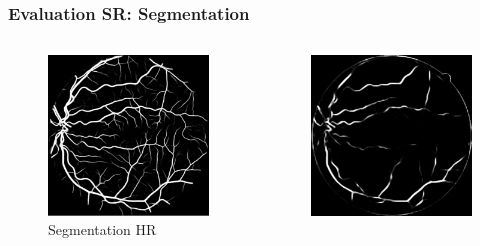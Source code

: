 \documentclass{beamer}
\begin{document}
\begin{frame} \frametitle{Evaluation SR: Segmentation}
  \begin{columns}
  \begin{column}{0.33\linewidth}
      \centering
      \begin{figure}[htb]
        \centering
        \includegraphics[width=1.0\textwidth]{segmentation_hr}
        \caption*{Segmentation HR}
      \end{figure}
    \end{column}
  \begin{column}{0.33\linewidth}
      \centering
      \begin{figure}[htb]
        \centering
        \includegraphics[width=1.0\textwidth]{segmentation_bic}

\end{figure}
\end{column}
\end{columns}
\end{frame}
\end{document}
